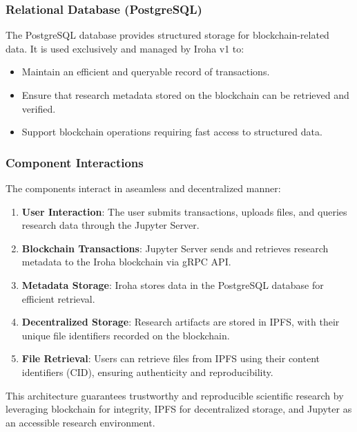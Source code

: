 \documentclass{article}
\begin{document}
\subsubsection{Relational Database (PostgreSQL)}
The PostgreSQL database provides structured storage for blockchain-related data. It is used exclusively and managed by Iroha v1 to:
\begin{itemize}
      \item Maintain an efficient and queryable record of transactions.
      \item Ensure that research metadata stored on the blockchain can be retrieved and verified.
      \item Support blockchain operations requiring fast access to structured data.
\end{itemize}

\subsubsection{Component Interactions}
The components interact in aseamless and decentralized manner:
\begin{enumerate}
      \item \textbf{User Interaction}: The user submits transactions, uploads files, and queries research data through the Jupyter Server.
      \item \textbf{Blockchain Transactions}: Jupyter Server sends and retrieves research metadata to the Iroha blockchain via gRPC API.
      \item \textbf{Metadata Storage}: Iroha stores data in the PostgreSQL database for efficient retrieval.
      \item \textbf{Decentralized Storage}: Research artifacts are stored in IPFS, with their unique file identifiers recorded on the blockchain.
      \item \textbf{File Retrieval}: Users can retrieve files from IPFS using their content identifiers (CID), ensuring authenticity and reproducibility.
\end{enumerate}

This architecture guarantees trustworthy and reproducible scientific research by leveraging blockchain for integrity, IPFS for decentralized storage, and Jupyter as an accessible research environment.
\end{document}
